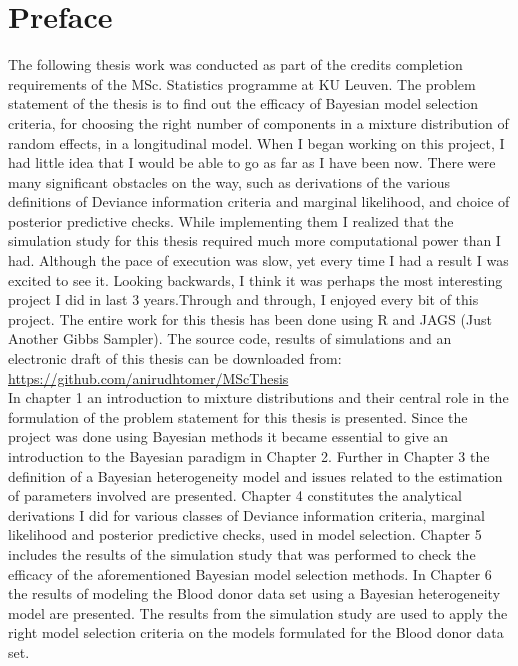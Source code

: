 \chapter{Preface}
\label{ch : preface}

The following thesis work was conducted as part of the credits completion requirements of the MSc. Statistics programme at KU Leuven. The problem statement of the thesis is to find out the efficacy of Bayesian model selection criteria, for choosing the right number of components in a mixture distribution of random effects, in a longitudinal model. When I began working on this project, I had little idea that I would be able to go as far as I have been now. There were many significant obstacles on the way, such as derivations of the various definitions of Deviance information criteria and marginal likelihood, and choice of posterior predictive checks. While implementing them I realized that the simulation study for this thesis required much more computational power than I had. Although the pace of execution was slow, yet every time I had a result I was excited to see it. Looking backwards, I think it was perhaps the most interesting project I did in last 3 years.Through and through, I enjoyed every bit of this project. The entire work for this thesis has been done using R and JAGS (Just Another Gibbs Sampler). The source code, results of simulations and an electronic draft of this thesis can be downloaded from:\\
\url{https://github.com/anirudhtomer/MScThesis}\\

In chapter 1 an introduction to mixture distributions and their central role in the formulation of the problem statement for this thesis is presented. Since the project was done using Bayesian methods it became essential to give an introduction to the Bayesian paradigm in Chapter 2. Further in Chapter 3 the definition of a Bayesian heterogeneity model and issues related to the estimation of parameters involved are presented. Chapter 4 constitutes the analytical derivations I did for various classes of Deviance information criteria, marginal likelihood and posterior predictive checks, used in model selection. Chapter 5 includes the results of the simulation study that was performed to check the efficacy of the aforementioned Bayesian model selection methods. In Chapter 6 the results of modeling the Blood donor data set \citep{nasserinejad_prevalence_2015} using a Bayesian heterogeneity model are presented. The results from the simulation study are used to apply the right model selection criteria on the models formulated for the Blood donor data set.\\

